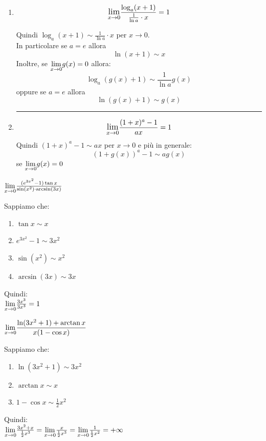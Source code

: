 \documentclass[12pt]{report}
\newcounter{exercise}
\begin{document}
\begin{enumerate}
		\par\noindent\rule{\linewidth}{0.5pt}\par
		\item \[\mathlarger{\lim_{x \to 0}}\frac{\log_a(x + 1)}{\frac{1}{\ln a} \cdot x} = 1\]

		Quindi $\log_a(x + 1) \sim \frac{1}{\ln a} \cdot x$ per $x \to 0$. \\
		In particolare se $a = e$ allora \[\ln(x + 1) \sim x\]
		Inoltre, se $\mathlarger{\lim_{x \to 0}}g(x) = 0$ allora: \[\log_a(g(x) + 1) \sim \frac{1}{\ln a}g(x)\] oppure se $a = e$ allora \[\ln(g(x) + 1) \sim g(x)\]

		\par\noindent\rule{\linewidth}{0.5pt}\par
		\item \[\mathlarger{\lim_{x \to 0}}\frac{(1 + x)^a - 1}{ax} = 1\]
		Quindi $(1 + x)^a - 1 \sim ax$ per $x \to 0$ e più in generale: \[(1 + g(x))^a - 1\sim ag(x)\] se $\mathlarger{\lim_{x \to 0}}g(x) = 0$
 	\end{enumerate}
 	\begin{assignment}{}{}
 		$\mathlarger{\lim_{x \to 0}}\frac{(e^{3x^2} - 1)\tan x}{\sin (x^2) \cdot \arcsin(3x)}$
 		\begin{exercise}{}{}
 			Sappiamo che:
 			\begin{enumerate}
 				\item $\tan x \sim x$
 				\item $e^{3x^2} - 1 \sim 3x^2$
 				\item $\sin (x^2) \sim x^2$
 				\item $\arcsin(3x) \sim 3x$
 			\end{enumerate}
 			Quindi: \\
 			$\mathlarger{\lim_{x \to 0}}\frac{3x^3}{3x^3} = 1$
 		\end{exercise}
 	\end{assignment}

 	\begin{assignment}{}{}
 		$\mathlarger{\lim_{x \to 0}}\dfrac{\ln(3x^2 + 1) + \arctan x}{x(1 - \cos x)}$
 		\begin{exercise}{}{}
 			Sappiamo che:
 			\begin{enumerate}
 				\item $\ln(3x^2 + 1) \sim 3x^2$
 				\item $\arctan x \sim x$
 				\item $1 - \cos x \sim \frac{1}{2}x^2$
 			\end{enumerate}
 			Quindi: \\
 			$\mathlarger{\lim_{x \to 0}}\frac{3x^2 + x}{\frac{1}{2}x^3} = \mathlarger{\lim_{x \to 0}}\frac{x}{\frac{1}{2}x^3} = \mathlarger{\lim_{x \to 0}}\frac{1}{\frac{1}{2}x^2} = +\infty$
 		\end{exercise}
 	\end{assignment}
\end{document}
